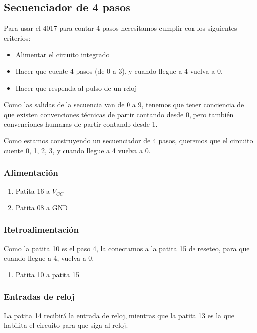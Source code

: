 \documentclass[../principal.tex]{subfiles}
\begin{document}
\subsection{Secuenciador de 4 pasos}

Para usar el 4017 para contar 4 pasos necesitamos cumplir con los siguientes criterios:

\begin{itemize}
    \item Alimentar el circuito integrado
    \item Hacer que cuente 4 pasos (de 0 a 3), y cuando llegue a 4 vuelva a 0.
    \item Hacer que responda al pulso de un reloj
\end{itemize}

Como las salidas de la secuencia van de 0 a 9, tenemos que tener conciencia de que existen convenciones técnicas de partir contando desde 0, pero también convenciones humanas de partir contando desde 1.

Como estamos construyendo un secuenciador de 4 pasos, queremos que el circuito cuente 0, 1, 2, 3, y cuando llegue a 4 vuelva a 0.

\subsubsection{Alimentación}

\begin{enumerate}
    \item Patita 16 a $V_{CC}$
    \item Patita 08 a GND
\end{enumerate}

\subsubsection{Retroalimentación}

Como la patita 10 es el paso 4, la conectamos a la patita 15 de reseteo, para que cuando llegue a 4, vuelva a 0.

\begin{enumerate}
    \item Patita 10 a patita 15
\end{enumerate}

\subsubsection{Entradas de reloj}

La patita 14 recibirá la entrada de reloj, mientras que la patita 13 es la que habilita el circuito para que siga al reloj.
\end{document}
